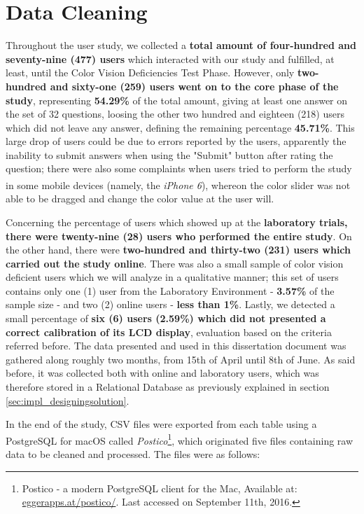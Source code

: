 \section{Data Cleaning}
\label{sec:results_datacleaning}
%
Throughout the user study, we collected a \textbf{total amount of four-hundred and seventy-nine (477) users} which interacted with our study and fulfilled,
at least, until the Color Vision Deficiencies Test Phase. However, only \textbf{two-hundred and sixty-one (259) users went on to the core phase of the study},
representing \textbf{54.29\%} of the total amount, giving at least one answer on the set of 32 questions, loosing the other two hundred and eighteen
(218) users which did not leave any answer, defining the remaining percentage \textbf{45.71\%}. This large drop of users could be due to errors
reported by the users, apparently the inability to submit answers when using the "Submit" button after rating the question; there were also some complaints
when users tried to perform the study in some mobile devices (namely, the \emph{iPhone\textsuperscript{\textregistered} 6}), whereon the color slider was
not able to be dragged and change the color value at the user will. \par
%
Concerning the percentage of users which showed up at the \textbf{laboratory trials, there were twenty-nine (28) users who performed the entire study}.
On the other hand, there were \textbf{two-hundred and thirty-two (231) users which carried out the study online}. There was also a small sample of color vision
deficient users which we will analyze in a qualitative manner; this set of users contains only one (1) user from the Laboratory Environment - \textbf{3.57\%} of
the sample size - and two (2) online users - \textbf{less than 1\%}. Lastly, we detected a small percentage of \textbf{six (6) users (2.59\%) which did not
presented a correct calibration of its LCD display}, evaluation based on the criteria referred before.
%
The data presented and used in this dissertation document was gathered along roughly two months, from 15th of April until 8th of June. As said before,
it was collected both with online and laboratory users, which was therefore stored in a Relational Database as previously explained in section
\ref{sec:impl_designingsolution}. \par
%
In the end of the study, \gls{CSV} files were exported from each table using a PostgreSQL for macOS called
\emph{Postico}\footnote{Postico - a modern PostgreSQL client for the Mac, Available at: \url{eggerapps.at/postico/}. Last accessed on
September 11th, 2016.}, which originated five files containing raw data to be cleaned and processed. The files were as follows:
